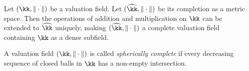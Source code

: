     \begin{lemma}\label{lem:completion_of_valuation_field}
        Let \((\kk,\|\cdot\|)\) be a valuation field.
        Let \((\widehat{\kk},\|\cdot\|)\) be its completion as a metric space.
        Then the operations of addition and multiplication on \(\kk\) can be extended to \(\widehat{\kk}\) uniquely, making \((\widehat{\kk},\|\cdot\|)\) a complete valuation field containing \(\kk\) as a dense subfield.
    \end{lemma}


    \begin{definition}\label{def:spherically_complete}
        A valuation field \((\kk,\|\cdot\|)\) is called \emph{spherically complete} if every decreasing sequence of closed balls in \(\kk\) has a non-empty intersection.
    \end{definition}
